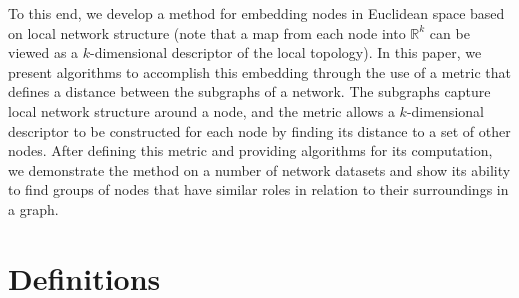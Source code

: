 \documentclass{article}
\begin{document}
To this end, we develop a method for embedding nodes in Euclidean space based on local network structure (note that a map from each node into $\mathbb{R}^{k}$ can be viewed as a $k$-dimensional descriptor of the local topology). In this paper, we present algorithms to accomplish this embedding through the use of a metric that defines a distance between the subgraphs of a network. The subgraphs capture local network structure around a node, and the metric allows a $k$-dimensional descriptor to be constructed for each node by finding its distance to a set of other nodes. After defining this metric and providing algorithms for its computation, we demonstrate the method on a number of network datasets and show its ability to find groups of nodes that have similar roles in relation to their surroundings in a graph. 


\section{Definitions}
\label{sec:defs}
\end{document}
